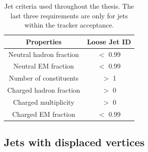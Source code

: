 \begin{table}[h]
	\centering
	\caption{Jet criteria used throughout the thesis. The last three requirements are only for jets within the tracker acceptance.}
	\begin{tabular}{cc}
		\toprule 
		Properties & Loose Jet ID \\ 
		\midrule
		Neutral hadron fraction & $<$ 0.99 \\ 
		
		Neutral EM fraction & $<$ 0.99 \\ 
		
		Number of constituents & $>$ 1 \\ 
		 		
		Charged hadron fraction & $>$ 0 \\ 
	 
		Charged multiplicity & $>$ 0 \\ 
		
		Charged EM fraction & $<$ 0.99 \\ 
		\bottomrule
	\end{tabular} 
	\label{tab:jetID}
\end{table}







\subsection{Jets with displaced vertices }


